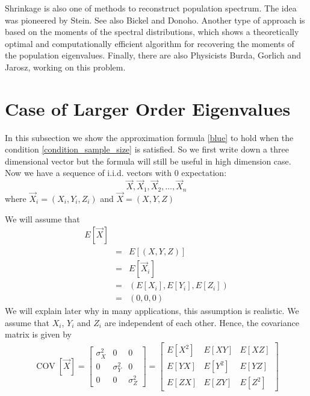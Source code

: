 \documentclass[12pt]{amsart}
\theoremstyle{definition}
\DeclareMathOperator{\Cov}{COV}
\numberwithin{equation}{section}
\numberwithin{equation}{section}
\theoremstyle{remark}
\numberwithin{equation}{section}
\begin{document}
Shrinkage is also one of methods to reconstruct population spectrum. The idea was pioneered by Stein\cite{stein1975estimation}. See also Bickel\cite{bickel2008regularized} and Donoho\cite{gavish2017optimal}. Another type of approach is based on the moments of the spectral distributions\cite{kong2017spectrum}, which shows a theoretically optimal and computationally efficient algorithm for recovering the moments of the population eigenvalues. Finally, there are also Physicists Burda, Gorlich and Jarosz, working on this problem\cite{burda2004signal}. 

\section{Case of Larger Order Eigenvalues}
\label{section_larger_order}
In this subsection we show the approximation formula \ref{blue} to hold when the condition \ref{condition_sample_size} is satisfied. So we first write down a three dimensional vector but the formula will still be useful in high dimension case. Now we have a sequence of i.i.d. vectors with $0$ expectation:
$$\vec{X},\vec{X}_1,\vec{X}_2,\ldots,\vec{X}_n$$
where $\vec{X}_i=(X_i,Y_i,Z_i)$ and
$\vec{X}=(X,Y,Z)$

We will assume that
\begin{eqnarray*}
E[\vec{X}]\\
&=&E[(X,Y,Z)]\\
&=&E[\vec{X}_i]\\
&=&(E[X_i],E[Y_i],E[Z_i])\\
&=&(0,0,0)
\end{eqnarray*}
We will explain later why in many applications, this assumption is realistic. We assume that $X_i$, $Y_i$ and $Z_i$ are independent of each other. Hence, the covariance matrix is given by
\begin{align*}
\Cov[\vec{X}]=
\left[
\begin{array}{ccccccccc}
\sigma_X^2&0&0\\
0&\sigma_Y^2&0\\
0&0&\sigma_Z^2
\end{array}
\right]=
\left[
\begin{array}{ccccccccc}
E[X^2]&E[XY]&E[XZ]\\
E[YX]&E[Y^2]&E[YZ]\\
E[ZX]&E[ZY]&E[Z^2]
\end{array}
\right]
\end{align*}
\end{document}
